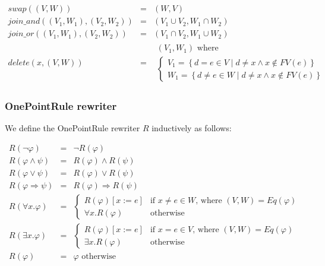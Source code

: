\begin{equation*}
\begin{array}{lll}
swap\left( \left( V,W\right) \right)  & = & \left( W,V\right)  \\ 
join\_and\left( \left( V_{1},W_{1}\right) ,\left( V_{2},W_{2}\right) \right) 
& = & \left( V_{1}\cup V_{2},W_{1}\cap W_{2}\right)  \\ 
join\_or\left( \left( V_{1},W_{1}\right) ,\left( V_{2},W_{2}\right) \right) 
& = & \left( V_{1}\cap V_{2},W_{1}\cup W_{2}\right)  \\ 
delete\left( x,\left( V,W\right) \right)  & = & 
\begin{array}{l}
\left( V_{1},W_{1}\right) \text{ where} \\ 
\left\{ 
\begin{array}{c}
V_{1}=\left\{ d=e\in V\mid d\neq x\wedge x\notin FV(e)\right\}  \\ 
W_{1}=\left\{ d\neq e\in W\mid d\neq x\wedge x\notin FV(e)\right\} 
\end{array}%
\right. 
\end{array}%
\end{array}%
\end{equation*}

\subsubsection{OnePointRule rewriter}

We define the OnePointRule rewriter $R$ inductively as follows:

\begin{equation*}
\begin{array}{lll}
R\left( \lnot \varphi \right) & = & \lnot R\left( \varphi \right) \\ 
R\left( \varphi \wedge \psi \right) & = & R\left( \varphi \right) \wedge
R\left( \psi \right) \\ 
R\left( \varphi \vee \psi \right) & = & R\left( \varphi \right) \vee R\left(
\psi \right) \\ 
R\left( \varphi \Rightarrow \psi \right) & = & R\left( \varphi \right)
\Rightarrow R\left( \psi \right) \\ 
R\left( \forall x.\varphi \right) & = & \left\{ 
\begin{array}{cc}
R\left( \varphi \right) \left[ x:=e\right] & \text{if }x\neq e\in W\text{,
where }\left( V,W\right) =Eq\left( \varphi \right) \\ 
\forall x.R\left( \varphi \right) & \text{otherwise}%
\end{array}%
\right. \\ 
R\left( \exists x.\varphi \right) & = & \left\{ 
\begin{array}{cc}
R\left( \varphi \right) \left[ x:=e\right] & \text{if }x=e\in V\text{, where 
}\left( V,W\right) =Eq\left( \varphi \right) \\ 
\exists x.R\left( \varphi \right) & \text{otherwise}%
\end{array}%
\right. \\ 
R\left( \varphi \right) & = & \varphi \text{ otherwise}%
\end{array}%
\end{equation*}

